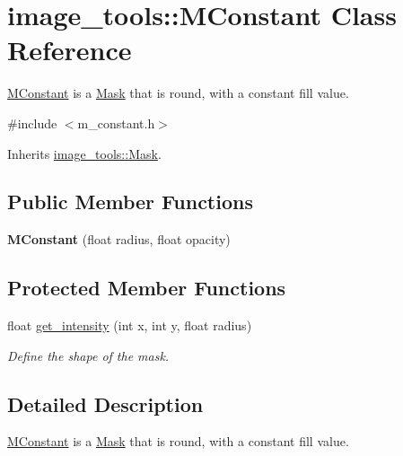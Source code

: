 \hypertarget{classimage__tools_1_1MConstant}{}\section{image\+\_\+tools\+:\+:M\+Constant Class Reference}
\label{classimage__tools_1_1MConstant}


\hyperlink{classimage__tools_1_1MConstant}{M\+Constant} is a \hyperlink{classimage__tools_1_1Mask}{Mask} that is round, with a constant fill value.  




{\ttfamily \#include $<$m\+\_\+constant.\+h$>$}



Inherits \hyperlink{classimage__tools_1_1Mask}{image\+\_\+tools\+::\+Mask}.

\subsection*{Public Member Functions}
\begin{DoxyCompactItemize}
\item 
{\bfseries M\+Constant} (float radius, float opacity)\hypertarget{classimage__tools_1_1MConstant_aa7ed8862e2011c527ce7589b76267edb}{}\label{classimage__tools_1_1MConstant_aa7ed8862e2011c527ce7589b76267edb}

\end{DoxyCompactItemize}
\subsection*{Protected Member Functions}
\begin{DoxyCompactItemize}
\item 
float \hyperlink{classimage__tools_1_1MConstant_a7d559b8473355bf08910b86e0da73de3}{get\+\_\+intensity} (int x, int y, float radius)
\begin{DoxyCompactList}\small\item\em Define the shape of the mask. \end{DoxyCompactList}\end{DoxyCompactItemize}


\subsection{Detailed Description}
\hyperlink{classimage__tools_1_1MConstant}{M\+Constant} is a \hyperlink{classimage__tools_1_1Mask}{Mask} that is round, with a constant fill value. 

